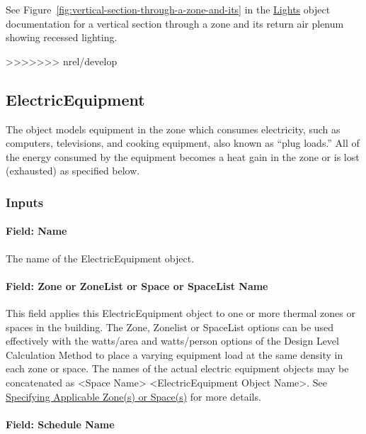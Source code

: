See Figure~\ref{fig:vertical-section-through-a-zone-and-its} in the \hyperref[lights-000]{Lights} object documentation for a vertical section through a zone and its return air plenum showing recessed lighting.

>>>>>>> nrel/develop
\subsection{ElectricEquipment}\label{electricequipment}

The object models equipment in the zone which consumes electricity, such as computers, televisions, and cooking equipment, also known as ``plug loads.'' All of the energy consumed by the equipment becomes a heat gain in the zone or is lost (exhausted) as specified below.

\subsubsection{Inputs}\label{inputs-3-019}

\paragraph{Field: Name}\label{field-name-3-017}

The name of the ElectricEquipment object.

\paragraph{Field: Zone or ZoneList or Space or SpaceList Name}\label{eleceq-field-zone-or-zonelist-name-000}

This field applies this ElectricEquipment object to one or more thermal zones or spaces in the building. The Zone, Zonelist or SpaceList options can be used effectively with the watts/area and watts/person options of the Design Level Calculation Method to place a varying equipment load at the same density in each zone or space. The names of the actual electric equipment objects may be concatenated as \textless{}Space Name\textgreater{} \textless{}ElectricEquipment Object Name\textgreater{}. See \hyperref[specifying-applicable-zones-or-spaces]{Specifying Applicable Zone(s) or Space(s)} for more details.

\paragraph{Field: Schedule Name}\label{field-schedule-name-1-001}

